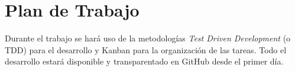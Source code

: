 \section{Plan de Trabajo}
Durante el trabajo se hará uso de la metodologías \textit{Test Driven
  Development} (o TDD) para el desarrollo y Kanban para la organización de
las tareas.
Todo el desarrollo estará disponible y transparentado en GitHub desde el primer
día.

